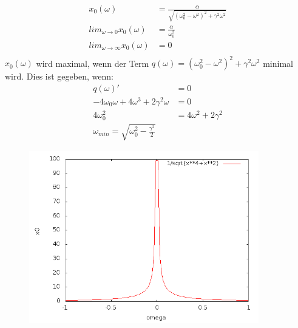 \documentclass[12pt,a4paper,notitlepage]{article}
\title{}
\begin{document}
\begin{align}
x_0(\omega)&=\frac{\alpha}{\sqrt{\left(\omega_0^2-\omega^2\right)^2+\gamma^2\omega^2}}\\
lim_{\omega\rightarrow 0}x_0(\omega)&=\frac{\alpha}{\omega_0^2}\\
lim_{\omega\rightarrow\infty}x_0(\omega)&=0\\
\end{align}
$x_0(\omega)$ wird maximal, wenn der Term $q(\omega)=\left(\omega_0^2-\omega^2\right)^2+\gamma^2\omega^2$ minimal wird. Dies ist gegeben, wenn:
\begin{align}
q(\omega)'&=0\\
-4\omega_0\omega+4\omega^3+2\gamma^2\omega&=0\\
4\omega_0^2&=4\omega^2+2\gamma^2\\
\omega_{min}=\sqrt{\omega_0^2-\frac{\gamma^2}{2}}
\end{align}
\begin{figure}
\begin{center}
\includegraphics[width=10cm]{curve.png}
\end{center}
\end{figure}
\end{document}
